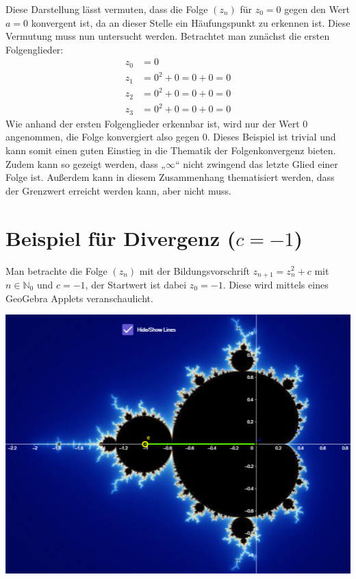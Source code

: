 \documentclass[a4paper, 12pt]{book}
\begin{document}
Diese Darstellung lässt vermuten, dass die Folge
\(\left( z_{n} \right)\) für \(z_{0} = 0\) gegen den Wert
\(a = 0\) konvergent ist, da an dieser Stelle ein Häufungspunkt zu
erkennen ist. Diese Vermutung muss nun untersucht werden. Betrachtet man
zunächst die ersten Folgenglieder:
\begin{align*}
z_{0} &= 0 \\
z_{1} &= 0^{2} + 0 = 0 + 0 = 0\\
z_{2} &= 0^{2} + 0 = 0 + 0 = 0\\
z_{3} &= 0^{2} + 0 = 0 + 0 = 0
\end{align*}
Wie anhand der ersten Folgenglieder erkennbar ist, wird nur der Wert 0
angenommen, die Folge konvergiert also gegen 0. Dieses Beispiel ist
trivial und kann somit einen guten Einstieg in die Thematik der
Folgenkonvergenz bieten. Zudem kann so gezeigt werden, dass
„\(\infty\)`` nicht zwingend das letzte Glied einer Folge ist. Außerdem
kann in diesem Zusammenhang thematisiert werden, dass der Grenzwert
erreicht werden kann, aber nicht muss.

\section{Beispiel für Divergenz ($c=-1$)}

Man betrachte die Folge \(\left( z_{n} \right)\) mit der
Bildungsvorschrift \(z_{n + 1} = z_{n}^{2} + c\) mit
\(n \in \mathbb{N}_{0}\) und \(c =  - 1\), der Startwert ist dabei
\(z_{0} =  - 1\). Diese wird mittels eines GeoGebra Applets
veranschaulicht.

\begin{center}
\includegraphics[width=0.5\linewidth]{image10.png}
\end{center}

\end{document}
